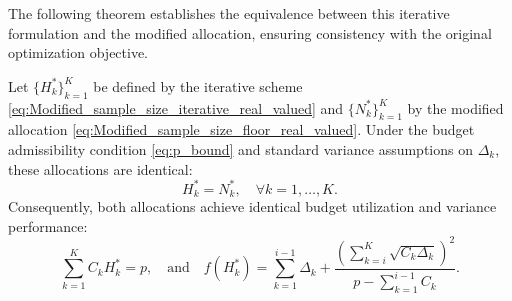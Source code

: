 The following theorem establishes the equivalence between this iterative formulation and the modified allocation, ensuring consistency with the original optimization objective.






\begin{theorem}
\label{thm:MFMC_modified_Iterative_RealValued_Sample_Size}
Let $\{H_k^*\}_{k=1}^K$ be defined by the iterative scheme \eqref{eq:Modified_sample_size_iterative_real_valued} and $\{N_k^*\}_{k=1}^K$ by the modified allocation \eqref{eq:Modified_sample_size_floor_real_valued}. Under the budget admissibility condition \eqref{eq:p_bound} and standard variance assumptions on $\Delta_k$, these allocations are identical:
\[
H_k^* = N_k^*, \quad \forall k = 1,\ldots,K.
\]
Consequently, both allocations achieve identical budget utilization and variance performance:
\[
\sum_{k=1}^K C_k H_k^* = p, 
\quad \text{and} \quad
f(H_k^*) = \sum_{k=1}^{i-1} \Delta_k + \frac{\left(\sum_{k=i}^K \sqrt{C_k \Delta_k}\right)^2}{p - \sum_{k=1}^{i-1} C_k}.
\]
\end{theorem}



